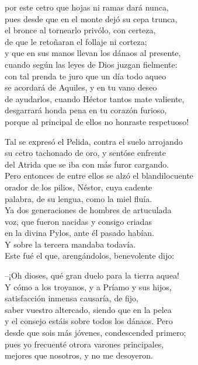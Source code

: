por este cetro que hojas ni ramas dará nunca,\\
pues desde que en el monte dejó su cepa trunca,\\
el bronce al tornearlo privólo, con certeza,\\
de que le retoñaran el follaje ni corteza;\\
y que en sus manos llevan los dánaos al presente,\\
cuando según las leyes de Dios juzgan fielmente:\\
con tal prenda te juro que un día todo aqueo\\
se acordará de Aquiles, y en tu vano deseo\\
de ayudarlos, cuando Héctor tantos mate valiente,\\
desgarrará honda pena en tu corazón furioso,\\
porque al principal de ellos no honraste respetuoso!\par
Tal se expresó el Pelida, contra el suelo arrojando\\
su cetro tachonado de oro, y sentóse enfrente\\
del Atrida que se iba con más furor cargando.\\
Pero entonces de entre ellos se alzó el blandilocuente\\
orador de los pilios, Néstor, cuya cadente\\
palabra, de su lengua, como la miel fluía.\\
Ya dos generaciones de hombres de artuculada\\
voz, que fueron nacidas y consigo criadas\\
en la divina Pylos, ante él pasado habían.\\
Y sobre la tercera mandaba todavía.\\
Este fué el que, arengándolos, benevolente dijo:\par
--¡Oh dioses, qué gran duelo para la tierra aquea!\\
Y cómo a los troyanos, y a Príamo y sus hijos,\\
satisfacción inmensa causaría, de fijo,\\
saber vuestro altercado, siendo que en la pelea\\
y el consejo estáis sobre todos los dánaos. Pero\\
desde que sois más jóvenes, condescended primero;\\
pues yo frecuenté otrora varones principales,\\
mejores que nosotros, y no me desoyeron.\\
